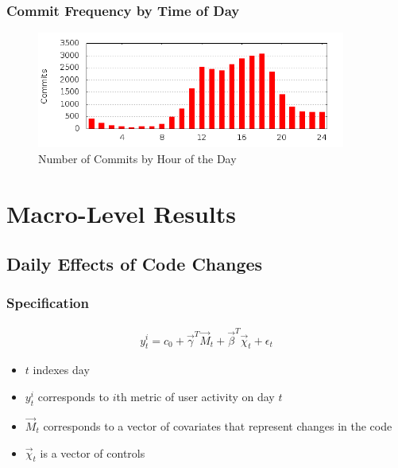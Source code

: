 \documentclass[xcolor=pdftex,dvipsnames,table]{beamer}
\begin{document}
\frame
{
    \frametitle{Commit Frequency by Time of Day}
    \begin{figure}[h!]
    \centering
    \includegraphics[width=4in]{pictures/commit-hours.png}
    \caption{Number of Commits by Hour of the Day}
    \label{fig:commit-hours}
    \end{figure}

}

\section{Macro-Level Results}

\subsection{Daily Effects of Code Changes}

\frame{\tableofcontents[currentsubsection]}

\frame
{
    \frametitle{Specification}
    \begin{eqnarray}
    y^i_{t} = c_0 + \vec{\gamma}^T \vec{M}_t + \vec{\beta}^T \vec{\chi}_t + \epsilon_t
    \end{eqnarray}

    \begin{itemize}
        \item $t$ indexes day
        \item $y^i_t$ corresponds to $i$th metric of user activity on day $t$
        \item $\vec{M}_t$ corresponds to a vector of covariates that represent changes in the code
        \item $\vec{\chi}_t$ is a vector of controls
    \end{itemize}
}   
\end{document}
